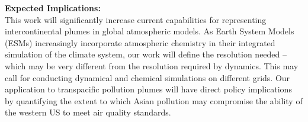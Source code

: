 \documentclass[fleqn, 11pt]{wlscirep}
\begin{document}
\textbf{Expected Implications:}\\
This work will significantly increase current capabilities for representing intercontinental plumes in global atmospheric models. As Earth System Models (ESMs) increasingly incorporate atmospheric chemistry in their integrated simulation of the climate system, our work will define the resolution needed – which may be very different from the resolution required by dynamics.  This may call for conducting dynamical and chemical simulations on different grids.  Our application to transpacific pollution plumes will have direct policy implications by quantifying the extent to which Asian pollution may compromise the ability of the western US to meet air quality standards. 

{\footnotesize
}
\end{document}
